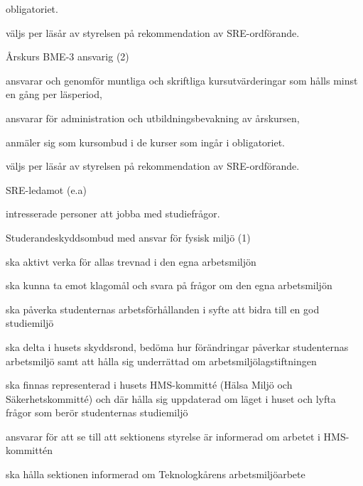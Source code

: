 \documentclass[10pt]{article}
\begin{document}
\begin{emptylist}
\begin{dashlist}
                obligatoriet.
             \item väljs per läsår av styrelsen på rekommendation av SRE-ordförande.
        \end{dashlist}
    \item Årskurs BME-3 ansvarig (2)
        \begin{dashlist}
            \item ansvarar och genomför muntliga och skriftliga
                kursutvärderingar som hålls minst en gång per läsperiod,
            \item ansvarar för administration och utbildningsbevakning av
                årskursen,
            \item anmäler sig som kursombud i de kurser som ingår i
                obligatoriet.
             \item väljs per läsår av styrelsen på rekommendation av SRE-ordförande.
        \end{dashlist}
    \item SRE-ledamot (e.a)
        \begin{dashlist}
            \item intresserade personer att jobba med studiefrågor.
        \end{dashlist}
    \item Studerandeskyddsombud med ansvar för fysisk miljö (1)
        \begin{dashlist}
            \item ska aktivt verka för allas trevnad i den egna arbetsmiljön
            \item ska kunna ta emot klagomål och svara på frågor om den egna arbetsmiljön
            \item ska påverka studenternas arbetsförhållanden i syfte att bidra till en god studiemiljö
            \item ska delta i husets skyddsrond, bedöma hur förändringar påverkar studenternas arbetsmiljö samt att
hålla sig underrättad om arbetsmiljölagstiftningen
			\item ska finnas representerad i husets HMS-kommitté (Hälsa Miljö och Säkerhetskommitté) och där hålla
sig uppdaterad om läget i huset och lyfta frågor som berör studenternas studiemiljö
			\item ansvarar för att se till att sektionens styrelse är informerad om arbetet i HMS-kommittén
			\item ska hålla sektionen informerad om Teknologkårens arbetsmiljöarbete
        \end{dashlist}

\end{emptylist}
\end{document}
